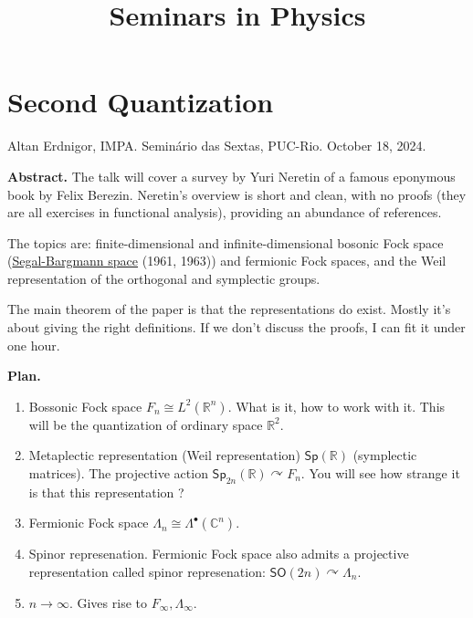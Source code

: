 



\title{Seminars in Physics}
\maketitle

\label{section-phantom}

\tableofcontents

\section{Second Quantization}
\label{section-erdnigor-second-quantization}

\noindent
Altan Erdnigor, IMPA.
Semin\'ario das Sextas, PUC-Rio.
October 18, 2024.

\medskip\noindent
{\bf Abstract.}
The talk will cover a survey by Yuri Neretin
of a famous eponymous book by Felix Berezin.
Neretin's overview is short and clean, with
no proofs (they are all exercises in
functional analysis), providing an abundance
of references.

The topics are: finite-dimensional and
infinite-dimensional bosonic Fock space
(\href{https://en.wikipedia.org/wiki/Segal%E2%80%93Bargmann_space}{Segal-Bargmann
space}
(1961, 1963)) and fermionic Fock spaces, and
the Weil representation of the orthogonal and
symplectic groups.

The main theorem of the paper is that the
representations do exist. Mostly it's about
giving the right definitions. If we don't
discuss the proofs, I can fit it under one
hour.

\bigskip\noindent
{\bf Plan.}
\begin{enumerate}
\item Bossonic Fock space $F_n\cong
L^2(\mathbb{R}^n)$. What is it, how to work
with it. This will be the quantization of
ordinary space $\mathbb{R}^{2}$.

\item Metaplectic representation (Weil
representation) $\mathsf{Sp}(\mathbb{R})$
(symplectic matrices). The projective action
$\mathsf{Sp}_{2n}(\mathbb{R})\curvearrowright
F_n$. You will see how strange it is that
this representation ?

\item Fermionic Fock space $\Lambda_n\cong
\Lambda^\bullet(\mathbb{C}^n)$.

\item Spinor represenation. Fermionic Fock
space also admits a projective representation
called spinor represenation: $\mathsf{SO}(2n)
\curvearrowright \Lambda_n$.

\item $n\to \infty$. Gives rise to $F_\infty,
\Lambda_\infty$.
\end{enumerate}

